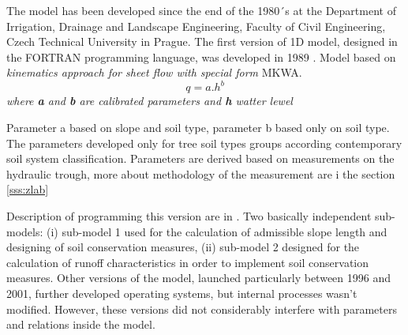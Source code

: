 The model has been developed since the end of the 1980´s at the Department of Irrigation, Drainage and Landscape Engineering, Faculty of Civil Engineering, Czech Technical University in Prague. The first version of 1D model, designed in the FORTRAN programming language, was developed in 1989 \citep{Holy1988}. Model based on \textit{kinematics approach for sheet flow with special form} MKWA.
\begin{equation}
q = a.h^b
\end{equation}
\textit{where \textbf{a} and \textbf{b} are calibrated parameters and \textbf{h} watter lewel}

Parameter a based on slope and soil type, parameter b based only on soil type.
The parameters developed only for tree soil types groups according contemporary soil system classification. Parameters are derived based on measurements on the hydraulic trough, more about methodology of the measurement are i the section \ref{sss:zlab}

 

Description of programming this version are in \citep{Holy1988}. Two basically independent sub-models: (i) sub-model 1 used for the calculation of admissible slope length and designing of soil conservation measures, (ii) sub-model 2 designed for the calculation of runoff characteristics in order to implement soil conservation measures.
Other versions of the model, launched particularly between 1996 and 2001, further developed operating systems, but internal processes wasn't modified. However, these versions did not considerably interfere with parameters and relations inside the model.

